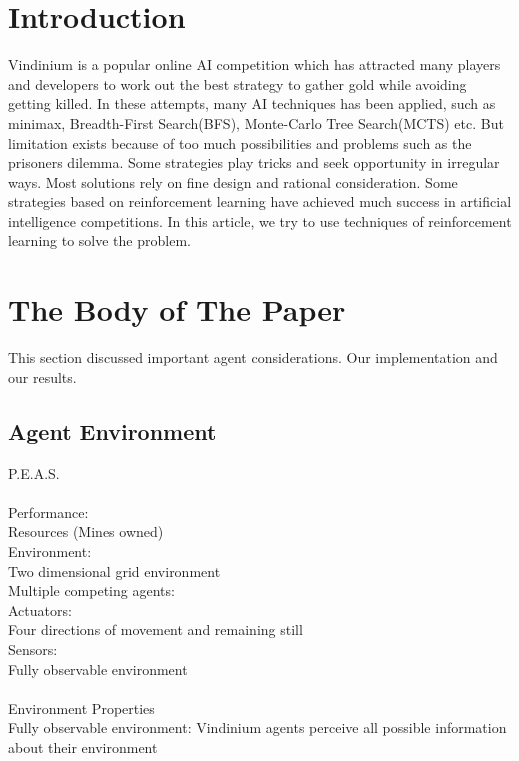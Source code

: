 \section{Introduction}

 
Vindinium is a popular online AI competition which has attracted many players and developers to work out the best strategy to gather gold while avoiding getting killed. In these attempts, many AI techniques has been applied, such as minimax, Breadth-First Search(BFS), Monte-Carlo Tree Search(MCTS) etc. But limitation exists because of too much possibilities and problems such as the prisoners dilemma. Some strategies play tricks and seek opportunity in irregular ways. Most solutions rely on fine design and rational consideration.
Some strategies based on reinforcement learning have achieved much success in artificial intelligence competitions. In this article, we try to use techniques of reinforcement learning to solve the problem.
 

\section{The Body of The Paper}
This section discussed important agent considerations. Our implementation and our results.

\subsection{Agent Environment}


P.E.A.S.\\\\
Performance:\\
Resources (Mines owned)\\
  Environment:\\
Two dimensional grid environment\\
  Multiple competing agents:\\
Actuators:\\
  Four directions of movement and remaining still\\
Sensors:\\
  Fully observable environment\\\\
  
Environment Properties\\
  
Fully observable environment: Vindinium agents perceive all possible information about their environment \\

